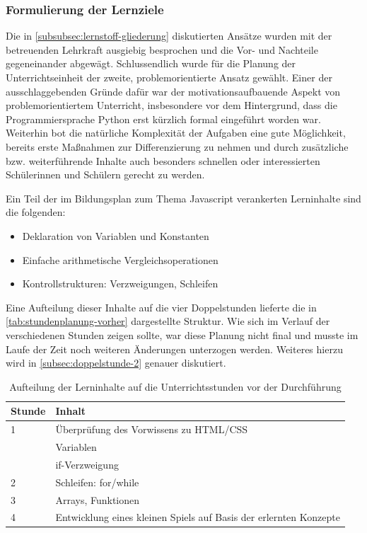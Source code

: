 \subsubsection{Formulierung der Lernziele}
\label{subsubsec:formulierung-lernziele}

Die in \autoref{subsubsec:lernstoff-gliederung} diskutierten Ansätze wurden mit der betreuenden Lehrkraft ausgiebig besprochen und die Vor- und Nachteile gegeneinander abgewägt.
Schlussendlich wurde für die Planung der Unterrichtseinheit der zweite, problemorientierte Ansatz gewählt.
Einer der  ausschlaggebenden Gründe dafür war der motivationsaufbauende Aspekt von problemorientiertem Unterricht, insbesondere vor dem Hintergrund, dass die Programmiersprache Python erst kürzlich formal eingeführt worden war.
Weiterhin bot die natürliche Komplexität der Aufgaben eine gute Möglichkeit, bereits erste Maßnahmen zur Differenzierung zu nehmen und durch zusätzliche bzw. weiterführende Inhalte auch besonders schnellen oder interessierten Schülerinnen und Schülern gerecht zu werden.

Ein Teil der im Bildungsplan zum Thema Javascript verankerten Lerninhalte \cite[BPE~19]{bildungsplan-tg-informatik} sind die folgenden:

\begin{itemize}
	\item Deklaration von Variablen und Konstanten
	\item Einfache arithmetische Vergleichsoperationen
	\item Kontrollstrukturen: Verzweigungen, Schleifen
\end{itemize}

Eine Aufteilung dieser Inhalte auf die vier Doppelstunden lieferte die in \autoref{tab:stundenplanung-vorher} dargestellte Struktur.
Wie sich im Verlauf der verschiedenen Stunden zeigen sollte, war diese Planung nicht final und musste im Laufe der Zeit noch weiteren Änderungen unterzogen werden.
Weiteres hierzu wird in \autoref{subsec:doppelstunde-2} genauer diskutiert.

\begin{table}[h!]
	\begin{tabular*}{\linewidth}{l|l}
		\hline
		\textbf{Stunde} & \textbf{Inhalt}\\
		\hline
		1 & Überprüfung des Vorwissens zu HTML/CSS\\
		& Variablen\\
		& if-Verzweigung\\
		\hline
		2 & Schleifen: for/while\\
		\hline
		3 & Arrays, Funktionen\\
		\hline
		4 & Entwicklung eines kleinen Spiels auf Basis der erlernten Konzepte\\
		\hline
	\end{tabular*}
	\caption{Aufteilung der Lerninhalte auf die Unterrichtsstunden vor der Durchführung}
	\label{tab:stundenplanung-vorher}
\end{table}

